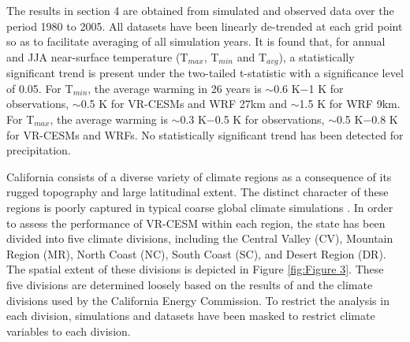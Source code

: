 \documentclass[draft,ms]{agutex}   %
\begin{document}
\begin{article}
The results in section 4 are obtained from simulated and observed data over the period 1980 to 2005.  All datasets have been linearly de-trended at each grid point so as to facilitate averaging of all simulation years. It is found that, for annual and JJA near-surface temperature (T$_{max}$, T$_{min}$ and T$_{avg}$), a statistically significant trend is present under the two-tailed t-statistic with a significance level of 0.05. For T$_{min}$, the average warming in 26 years is $\sim$0.6 K$-$1 K for observations, $\sim$0.5 K for VR-CESMs and WRF 27km and $\sim$1.5 K for WRF 9km. For T$_{max}$, the average warming is $\sim$0.3 K$-$0.5 K for observations, $\sim$0.5 K$-$0.8 K for VR-CESMs and WRFs. No statistically significant trend has been detected for precipitation.

California consists of a diverse variety of climate regions as a consequence of its rugged topography and large latitudinal extent.  The distinct character of these regions is poorly captured in typical coarse global climate simulations \citep{abatzoglou2009classification, caldwell2009evaluation}.  In order to assess the performance of VR-CESM within each region, the state has been divided into five climate divisions, including the Central Valley (CV), Mountain Region (MR), North Coast (NC), South Coast (SC), and Desert Region (DR).  The spatial extent of these divisions is depicted in Figure \ref{fig:Figure 3}. These five divisions are determined loosely based on the results of \cite{abatzoglou2009classification} and the climate divisions used by the California Energy Commission. To restrict the analysis in each division, simulations and datasets have been masked to restrict climate variables to each division. 



\end{article}
\end{document}
